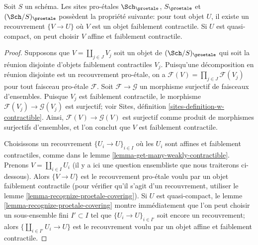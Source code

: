 \begin{lemma}
\label{lemma-weakly-contractible-cover}
Soit $S$ un schéma. Les sites pro-\'etales
$\Sch_\proetale$, $S_\proetale$ et $(\Sch/S)_\proetale$
possèdent la propriété suivante: pour tout objet
$U$, il existe un recouvrement $\{V \to U\}$ où $V$ est un
objet faiblement contractile. Si $U$ est quasi-compact, on peut
choisir $V$ affine et faiblement contractile.
\end{lemma}

\begin{proof}
Supposons que $V = \coprod_{j \in J} V_j$ soit un objet de $(\Sch/S)_\proetale$
qui soit la réunion disjointe d'objets faiblement contractiles $V_j$.
Puisqu'une décomposition en réunion disjointe est un recouvrement pro-\'etale,
on a $\mathcal{F}(V) = \prod_{j \in J} \mathcal{F}(V_j)$ pour tout
faisceau pro-\'etale $\mathcal{F}$. Soit $\mathcal{F} \to \mathcal{G}$
un morphisme surjectif de faisceaux d'ensembles. Puisque $V_j$ est faiblement contractile,
le morphisme $\mathcal{F}(V_j) \to \mathcal{G}(V_j)$ est surjectif; voir
Sites, définition \ref{sites-definition-w-contractible}.
Ainsi, $\mathcal{F}(V) \to \mathcal{G}(V)$ est surjectif comme produit
de morphismes surjectifs d'ensembles, et l'on conclut que $V$ est faiblement contractile.

\medskip\noindent
Choisissons un recouvrement $\{U_i \to U\}_{i \in I}$ où les $U_i$ sont affines et
faiblement contractiles, comme dans le lemme \ref{lemma-get-many-weakly-contractible}.
Prenons $V = \coprod_{i \in I} U_i$ (il y a ici une question ensembliste
que nous traiterons ci-dessous). Alors $\{V \to U\}$ est le recouvrement
pro-\'etale voulu par un objet faiblement contractile
(pour vérifier qu'il s'agit d'un recouvrement, utiliser le
lemme \ref{lemma-recognize-proetale-covering}).
Si $U$ est quasi-compact, le
lemme \ref{lemma-recognize-proetale-covering}
montre immédiatement que l'on peut choisir un sous-ensemble fini $I' \subset I$ tel que
$\{U_i \to U\}_{i \in I'}$ soit encore un recouvrement;
alors $\{\coprod_{i \in I'} U_i \to U\}$ est le recouvrement voulu
par un objet affine et faiblement contractile.


\end{proof}
